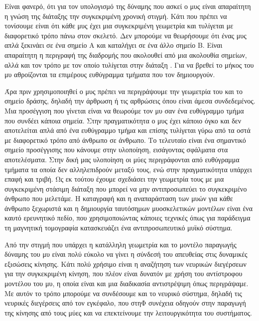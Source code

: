 Είναι φανερό, ότι για τον υπολογισμό της δύναμης που ασκεί ο μυς είναι απαραίτητη η γνώση της διάταξης την συγκεκριμένη χρονική στιγμή. Κάτι που πρέπει να τονίσουμε είναι ότι κάθε μυς έχει μια συγκεκριμένη γεωμετρία και τυλίγεται με διαφορετικό τρόπο πάνω στον σκελετό. Δεν μπορούμε να θεωρήσουμε ότι ένας μυς απλά ξεκινάει σε ένα σημείο Α και καταλήγει σε ένα άλλο σημείο Β. Είναι απαραίτητη η περιγραφή της διαδρομής που ακολουθεί από μια ακολουθία σημείων, αλλά και τον τρόπο με τον οποίο τυλίγεται στην διάταξη \cite{delp95}. Για να βρεθεί το μήκος του μυ αθροίζονται τα επιμέρους ευθύγραμμα τμήματα που τον δημιουργούν.

Άρα πριν χρησιμοποιηθεί ο μυς πρέπει να περιγράψουμε την γεωμετρία του και το σημείο δράσης, δηλαδή την άρθρωση ή τις αρθρώσεις όπου είναι άμεσα συνδεδεμένος. Μια προσέγγιση που γίνεται είναι να θεωρούμε τον μυ σαν ένα ευθύγραμμο τμήμα που συνδέει κάποια σημεία. Στην πραγματικότητα ο μυς έχει κάποιο όγκο και δεν αποτελείται απλά από ένα ευθύγραμμο τμήμα και επίσης τυλίγεται γύρω από τα οστά με διαφορετικό τρόπο από άνθρωπο σε άνθρωπο. Το τελευταίο είναι ένα σημαντικό σημείο προσέγγισης που κάνουμε στην υλοποίηση, εισάγοντας σφάλματα στα αποτελέσματα. Στην δική μας υλοποίηση οι μύες περιγράφονται από ευθύγραμμα τμήματα τα οποία δεν αλληλεπιδρούν μεταξύ τους, ενώ στην πραγματικότητα υπάρχει επαφή και τριβή. Ως εκ τούτου έχουμε σχεδιάσει την γεωμετρία τους με μια συγκεκριμένη στάσιμη διάταξη που μπορεί να μην αντιπροσωπεύει το συγκεκριμένο άνθρωπο που μελετάμε. Η καταγραφή και η αναπαράσταση των μυών για κάθε άνθρωπο ξεχωριστά και η δημιουργία ταυτόσημων μυοσκελετικών μοντέλων είναι ένα καυτό ερευνητικό πεδίο, που χρησιμοποιώντας κάποιες τεχνικές όπως για παράδειγμα τη μαγνητική τομογραφία κατασκευάζει ένα αντιπροσωπευτικό μυϊκό σύστημα.

Από την στιγμή που υπάρχει η κατάλληλη γεωμετρία και το μοντέλο παραγωγής δύναμης του μυ είναι πολύ εύκολο να γίνει η σύνδεσή του απευθείας στις δυναμικές εξισώσεις κίνησης. Κάτι πολύ χρήσιμο είναι η αναζήτηση των νευρικών διεγέρσεων για την συγκεκριμένη κίνηση, που πλέον είναι δυνατόν με χρήση του αντίστροφου μοντέλου του μυ, η οποία είναι και μια διαδικασία αντιστρέψιμη όπως περιγράψαμε. Με αυτόν το τρόπο μπορούμε να συνδέσουμε και το νευρικό σύστημα, δηλαδή τις νευρικές διεγέρσεις από τον εγκέφαλο, που στηΦ συνέχεια οδηγούν στην παραγωγή της κίνησης από τους μύες και να επεκτείνουμε την λειτουργικότητα του συστήματος.
